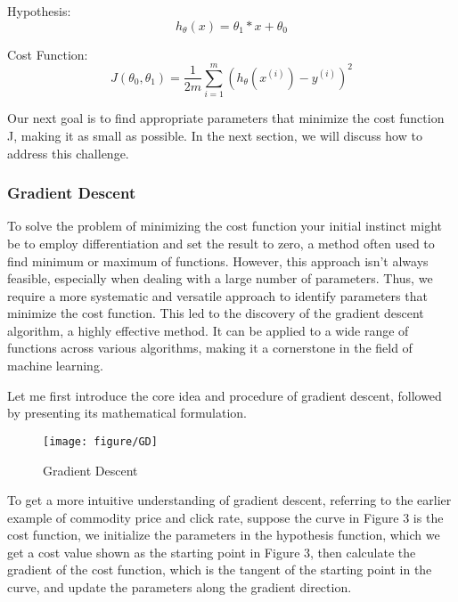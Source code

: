 \documentclass{article}
\begin{document}
     Hypothesis:
     \begin{equation}
     h_\theta(x)= \theta_{1} * x  + \theta_{0}
     \end{equation}
     \hspace*{\fill}

     \hspace*{\fill}

     Cost Function:
    \begin{equation}
     J\left(\theta_0, \theta_1\right)=\frac{1}{2 m} \sum_{i=1}^m\left(h_\theta\left(x^{(i)}\right)-y^{(i)}\right)^2
    \end{equation}

     \hspace*{\fill}



    Our next goal is to find appropriate parameters that minimize the cost function J, making it as small as possible. In the next section, we will discuss how to address this challenge.


    \newpage
	\subsubsection{Gradient Descent}
    To solve the problem of minimizing the cost function your initial instinct might be to employ differentiation and set the result to zero, a method often used to find minimum or maximum of functions. However, this approach isn't always feasible, especially when dealing with a large number of parameters. Thus, we require a more systematic and versatile approach to identify parameters that minimize the cost function. This led to the discovery of the gradient descent algorithm, a highly effective method. It can be applied to a wide range of functions across various algorithms, making it a cornerstone in the field of machine learning.

Let me first introduce the core idea and procedure of gradient descent, followed by presenting its mathematical formulation.


    \begin{figure}[htbp]
        \centering
        \texttt{[image: figure/GD]}
        \caption{Gradient Descent}
     \end{figure}

     To get a more intuitive understanding of gradient descent, referring to the earlier example of commodity price and click rate, suppose the curve in Figure 3 is the cost function, we initialize the parameters in the hypothesis function, which we get a cost value shown as the starting point in Figure 3, then calculate the gradient of the cost function, which is the tangent of the starting point in the curve, and update the parameters along the gradient direction.
\end{document}
